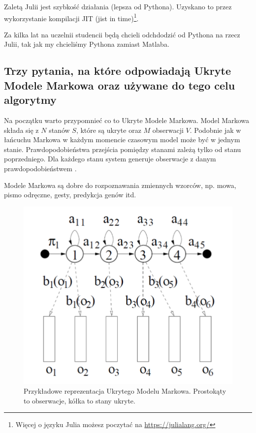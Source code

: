 \documentclass[wi]{zut}
\begin{document}
Zaletą Julii jest szybkość działania (lepsza od Pythona). Uzyskano to przez wykorzystanie kompilacji JIT (jist in time)\footnote{Więcej o języku Julia możesz poczytać na \url{https://julialang.org/}}. 

Za kilka lat na uczelnii studencii będą chcieli odchdodzić od Pythona na rzecz Julii, tak jak my chcieliśmy Pythona zamiast Matlaba.




\subsection{Trzy pytania, na które odpowiadają Ukryte Modele Markowa oraz używane do tego celu algorytmy}

Na początku warto przypomnieć co to Ukryte Modele Markowa. Model Markowa składa się z $N$ stanów $S$, które są ukryte oraz $M$ obserwacji $V$. Podobnie jak w łańcuchu Markowa w każdym momencie czasowym model może być w jednym stanie. Prawdopodobieństwa przejścia pomiędzy stanami zależą tylko od stanu poprzedniego. Dla każdego stanu system generuje obserwacje z danym prawdopodobieństwem \cite{Pietrzykowski2020}. 

Modele Markowa są dobre do rozpoznawania zmiennych wzorców, np. mowa, pismo odręczne, gesty, predykcja genów itd.\cite{Pietrzykowski2020}

\begin{figure}[H]
    \centering
    \includegraphics[width=0.5\linewidth]{images/hidden_markov.png}
    \caption{Przykładowe reprezentacja Ukrytego Modelu Markowa. Prostokąty to obserwacje, kółka to stany ukryte.}
    \label{fig:pdgd}
\end{figure}
\end{document}
